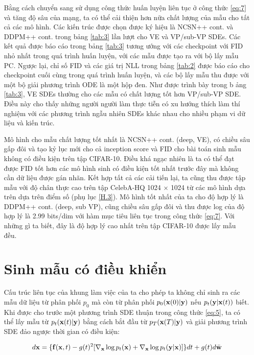 \documentclass{article} %
\begin{document}
Bằng cách chuyển sang sử dụng công thức huấn luyện liên tục ở công thức \ref{eq:7} và tăng độ sâu của mạng, ta có thể cải thiện hơn nữa chất lượng của mẫu cho tất cả các mô hình.
Các kiến trúc được chọn được ký hiệu là NCSN++ cont. và DDPM++ cont. trong bảng \ref{tab:3} lần lượt cho VE và VP/sub-VP SDEs.
Các kết quả được báo cáo trong bảng \ref{tab:3} tương ướng với các checkpoint với FID nhỏ nhất trong quá trình huấn luyện, với các mẫu được tạo ra với bộ lấy mẫu PC.
Ngược lại, chỉ số FID và các giá trị NLL trong bảng \ref{tab:2} được báo cáo cho checkpoint cuối cùng trong quá trình huấn luyện, và các bộ lấy mẫu thu được với một bộ giải phương trình ODE là một hộp đen.
Như được trình bày trong b ảng \ref{tab:3}, VE SDEs thường cho các mẫu có chất lượng tốt hơn VP/sub-VP SDE.
Điều này cho thấy những người người làm thực tiễn có xu hướng thích làm thí nghiệm với các phương trình ngẫu nhiên SDEs khác nhau cho nhiều phạm vi dữ liệu và kiến trúc.

Mô hình cho mẫu chất lượng tốt nhất là NCSN++ cont. (deep, VE), có chiều sâu gấp đôi và tạo kỷ lục mới cho cả inception score và FID cho bài toán sinh mẫu không có điều kiện trên tập CIFAR-10.
Điều khá ngạc nhiên là ta có thể đạt được FID tốt hơn các mô hình sinh có điều kiện tốt nhất trước đây mà không cần dữ liệu được gán nhãn.
Kết hợp tất cả các cải tiến lại, ta cũng thu được tập mẫu với độ chân thực cao trên tập CelebA-HQ 1024 $\times$ 1024 từ các mô hình dựa trên dựa trên điểm số (phụ lục \ref{H.3}).
Mô hình tốt nhất của ta cho độ hợp lý là DDPM++ cont. (deep, sub VP), cũng chiều sâu gấp đôi và thu được log của độ hợp lý là 2.99 bits/dim với hàm mục tiêu liên tục trong công thức \ref{eq:7}.
Với những gì ta biết, đây là độ hợp lý cao nhất trên tập CIFAR-10 được lấy mẫu đều.

\section{Sinh mẫu có điều khiển}

Cấu trúc liên tục của khung làm việc của ta cho phép ta không chỉ sinh ra các mẫu dữ liệu từ phân phối $p_0$ mà còn từ phân phối $p_0 (\bold{x}(0) \vert \bold{y})$ nếu $p_t (\bold{y} \vert \bold{x}(t))$ biết.
Khi được cho trước một phương trình SDE thuận trong công thức \ref{eq:5}, ta có thể lấy mẫu từ $p_t(\bold{x}(t) \vert \bold{y})$ bằng cách bắt đầu từ $p_T (\bold{x}(T) \vert \bold{y})$ và giải phương trình SDE đảo ngược thời gian có điều kiện:

\begin{equation} \label{eq:14}
    d \bold{x} = \lbrace \bold{f}(\bold{x}, t) - g (t)^2 \lbrack \nabla_{\bold{x}} \log p_t(\bold{x}) + \nabla_{\bold{x}} \log p_t (\bold{y} \vert \bold{x}) \rbrack \rbrace dt + g(t) d \bar{\bold{w}}
\end{equation}
\end{document}
